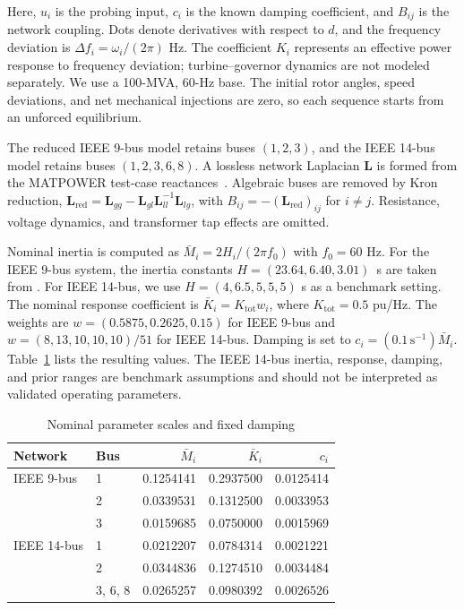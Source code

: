 \documentclass[conference,letterpaper]{IEEEtran}
\newcommand{\papertablestyle}{\centering\small\setlength{\tabcolsep}{3pt}\renewcommand{\arraystretch}{1.05}}
\begin{document}
Here, $u_i$ is the probing input, $c_i$ is the known damping coefficient, and $B_{ij}$ is the network coupling. Dots denote derivatives with respect to $d$, and the frequency deviation is $\Delta f_i=\omega_i/(2\pi)$ Hz. The coefficient $K_i$ represents an effective power response to frequency deviation; turbine--governor dynamics are not modeled separately. We use a 100-MVA, 60-Hz base. The initial rotor angles, speed deviations, and net mechanical injections are zero, so each sequence starts from an unforced equilibrium.

The reduced IEEE 9-bus model retains buses $(1,2,3)$, and the IEEE 14-bus model retains buses $(1,2,3,6,8)$. A lossless network Laplacian $\mathbf L$ is formed from the MATPOWER test-case reactances~\cite{zimmerman2011matpower}. Algebraic buses are removed by Kron reduction, $\mathbf L_{\mathrm{red}}=\mathbf L_{gg}-\mathbf L_{gl}\mathbf L_{ll}^{-1}\mathbf L_{lg}$, with $B_{ij}=-(\mathbf L_{\mathrm{red}})_{ij}$ for $i\ne j$. Resistance, voltage dynamics, and transformer tap effects are omitted.

Nominal inertia is computed as $\bar M_i=2H_i/(2\pi f_0)$ with $f_0=60$ Hz. For the IEEE 9-bus system, the inertia constants $H=(23.64,6.40,3.01)$~s are taken from \cite{kaur2016transient}. For IEEE 14-bus, we use $H=(4,6.5,5,5,5)$ s as a benchmark setting. The nominal response coefficient is $\bar K_i=K_{\mathrm{tot}}w_i$, where $K_{\mathrm{tot}}=0.5$ pu/Hz. The weights are $w=(0.5875,0.2625,0.15)$ for IEEE 9-bus and $w=(8,13,10,10,10)/51$ for IEEE 14-bus. Damping is set to $c_i=(0.1\,\mathrm{s}^{-1})\bar M_i$. Table~\ref{tab:physical} lists the resulting values. The IEEE 14-bus inertia, response, damping, and prior ranges are benchmark assumptions and should not be interpreted as validated operating parameters.

\begin{table}[!t]
\caption{Nominal parameter scales and fixed damping}
\label{tab:physical}\papertablestyle
\begin{tabular*}{\columnwidth}{@{\extracolsep{\fill}}llrrr@{}}
\toprule Network & Bus & $\bar M_i$ & $\bar K_i$ & $c_i$\\\midrule
IEEE 9-bus & 1 & 0.1254141 & 0.2937500 & 0.0125414\\
 & 2 & 0.0339531 & 0.1312500 & 0.0033953\\
 & 3 & 0.0159685 & 0.0750000 & 0.0015969\\
IEEE 14-bus & 1 & 0.0212207 & 0.0784314 & 0.0021221\\
 & 2 & 0.0344836 & 0.1274510 & 0.0034484\\
 & 3, 6, 8 & 0.0265257 & 0.0980392 & 0.0026526\\
\bottomrule\end{tabular*}\end{table}
\end{document}
